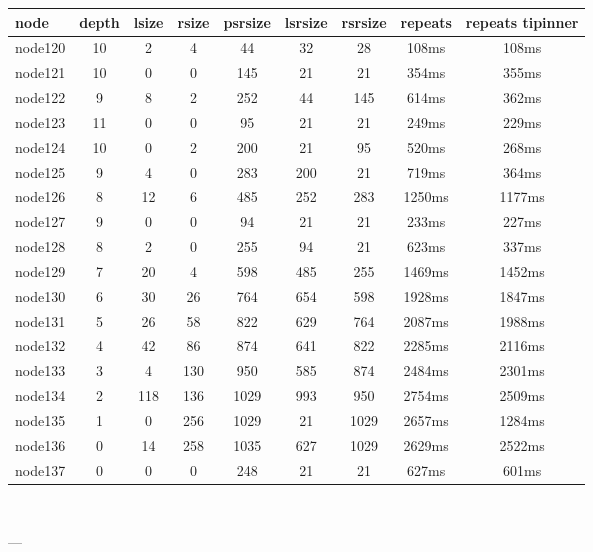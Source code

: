 \begin{tabular}{|l|c|c|c|c|c|c|c|c|}
\hline node & depth & lsize & rsize & psrsize & lsrsize & rsrsize   & repeats & repeats tipinner\\
    \hline node120 & 10 & 2 & 4 & 44 & 32 & 28 & 108ms & 108ms\\
    \hline node121 & 10 & 0 & 0 & 145 & 21 & 21 & 354ms & 355ms\\
    \hline node122 & 9 & 8 & 2 & 252 & 44 & 145 & 614ms & 362ms\\
    \hline node123 & 11 & 0 & 0 & 95 & 21 & 21 & 249ms & 229ms\\
    \hline node124 & 10 & 0 & 2 & 200 & 21 & 95 & 520ms & 268ms\\
    \hline node125 & 9 & 4 & 0 & 283 & 200 & 21 & 719ms & 364ms\\
    \hline node126 & 8 & 12 & 6 & 485 & 252 & 283 & 1250ms & 1177ms\\
    \hline node127 & 9 & 0 & 0 & 94 & 21 & 21 & 233ms & 227ms\\
    \hline node128 & 8 & 2 & 0 & 255 & 94 & 21 & 623ms & 337ms\\
    \hline node129 & 7 & 20 & 4 & 598 & 485 & 255 & 1469ms & 1452ms\\
    \hline node130 & 6 & 30 & 26 & 764 & 654 & 598 & 1928ms & 1847ms\\
    \hline node131 & 5 & 26 & 58 & 822 & 629 & 764 & 2087ms & 1988ms\\
    \hline node132 & 4 & 42 & 86 & 874 & 641 & 822 & 2285ms & 2116ms\\
    \hline node133 & 3 & 4 & 130 & 950 & 585 & 874 & 2484ms & 2301ms\\
    \hline node134 & 2 & 118 & 136 & 1029 & 993 & 950 & 2754ms & 2509ms\\
    \hline node135 & 1 & 0 & 256 & 1029 & 21 & 1029 & 2657ms & 1284ms\\
    \hline node136 & 0 & 14 & 258 & 1035 & 627 & 1029 & 2629ms & 2522ms\\
    \hline node137 & 0 & 0 & 0 & 248 & 21 & 21 & 627ms & 601ms\\

\hline
\end{tabular} \

---

